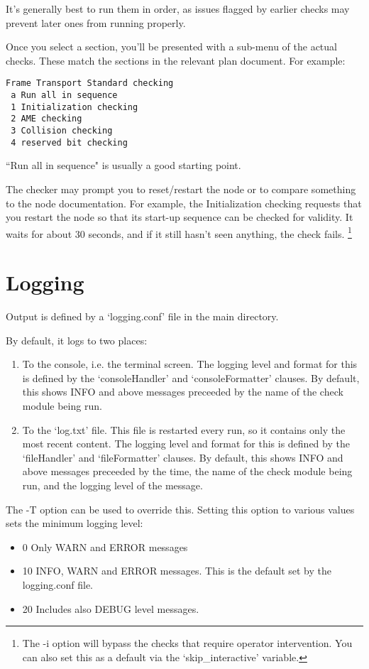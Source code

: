 It's generally best to run them in order, as issues flagged by earlier
checks may prevent later ones from running properly.

Once you select a section, you'll be presented with a sub-menu of the
actual checks.  These match the sections in the relevant plan document.
For example:

\begin{verbatim}
Frame Transport Standard checking
 a Run all in sequence
 1 Initialization checking
 2 AME checking
 3 Collision checking
 4 reserved bit checking
\end{verbatim}

``Run all in sequence" is usually a good starting point.

The checker may prompt you to reset/restart the node or to
compare something to the node documentation. For example,
the Initialization checking requests that you restart the node
so that its start-up sequence can be checked for validity.
It waits for about 30 seconds, and if it still hasn't seen anything, the
check fails.
\footnote{The -i option will bypass the
checks that require operator intervention.  
You can also set this as a default via the `skip\_interactive' variable.
}

\section{Logging}

Output is defined by a `logging.conf' file in the main directory.

By default, it logs to two places:
\begin{enumerate}
\item To the console, i.e. the terminal screen.  The logging level and format
for this is defined by the `consoleHandler' and `consoleFormatter' clauses.
By default, this shows INFO and above messages preceeded by the name of the 
check module being run.
\item To the `log.txt' file. This file is restarted every run, so it 
contains only the most recent content. The logging level and format
for this is defined by the `fileHandler' and `fileFormatter' clauses.
By default, this shows INFO and above messages preceeded by the 
time, the name of the check module being run, and the logging level of the message.
\end{enumerate}

The -T option can be used to override this.  Setting this option to
various values sets the minimum logging level:
\begin{itemize}
\item 0 Only WARN and ERROR messages
\item 10 INFO, WARN and ERROR messages.  This is the default set by the logging.conf file.
\item 20 Includes also DEBUG level messages.
\end{itemize}

